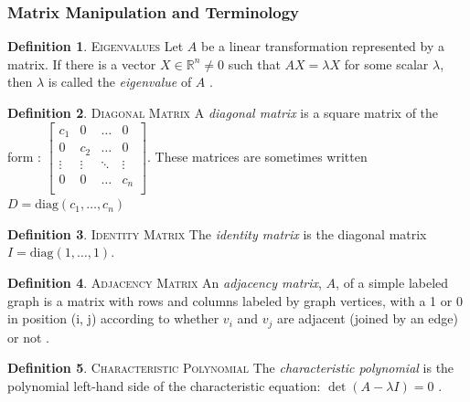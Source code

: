 \documentclass[11pt]{article}
\newcommand{\R}{\mathbb{R}}
\theoremstyle{definition}
\newtheorem{definition}{Definition}[section]
\begin{document}
\subsubsection{Matrix Manipulation and Terminology}

	\theoremstyle{definition}
	\begin{definition}{\textsc{Eigenvalues}}
		Let $A$ be a linear transformation represented by a matrix. If there is a vector $X \in \R^n \neq 0$ such that $AX = \lambda X$ for some scalar $\lambda$, then $\lambda$ is called the \emph{eigenvalue} of $A$ \cite{mathworld:Eigenvalue}.
	\end{definition}
	
	\theoremstyle{definition}
	\begin{definition}{\textsc{Diagonal Matrix}}
		A \emph{diagonal matrix} is a square matrix of the form \cite{mathworld:DiagonalMatrix}:
		$\begin{bmatrix}
			c_1 & 0 & \dots & 0 \\
			0 & c_2 & \dots & 0 \\
			\vdots & \vdots  & \ddots  & \vdots \\
			0 & 0 & \dots & c_n \\
		\end{bmatrix}$. These matrices are sometimes written $D = \text{diag}(c_1, \dots, c_n)$
	\end{definition}
	
	\theoremstyle{definition}
	\begin{definition}{\textsc{Identity Matrix}}
		The \emph{identity matrix} is the diagonal matrix $I = \text{diag}(1, \dots, 1)$.
	\end{definition}
	
	\theoremstyle{definition}
	\begin{definition}{\textsc{Adjacency Matrix}}
		An \emph{adjacency matrix}, $A$, of a simple labeled graph is a matrix with rows and columns labeled by graph vertices, with a 1 or 0 in position (i, j) according to whether $v_i$ and $v_j$ are adjacent (joined by an edge) or not \cite{mathworld:AdjacencyMatrix}. 
	\end{definition}
	
	\theoremstyle{definition}
	\begin{definition}{\textsc{Characteristic Polynomial}}
		The \emph{characteristic polynomial} is the polynomial left-hand side of the characteristic equation: $\det(A - \lambda I) = 0$ \cite{mathworld:CharacteristicPoly}.
	\end{definition}
	
\end{document}
